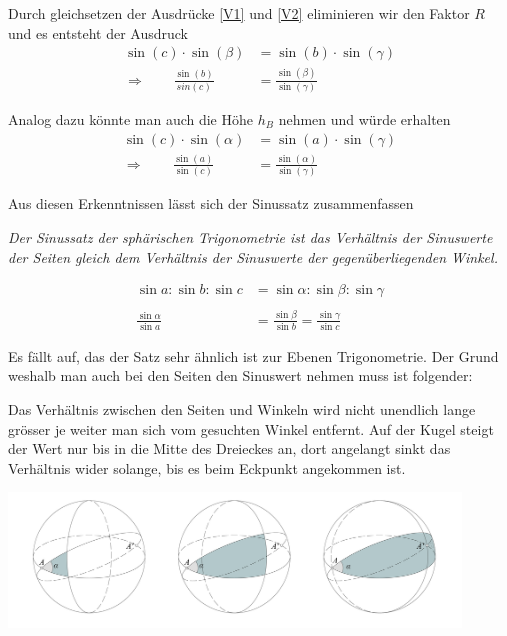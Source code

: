 \begin{refsection}
Durch gleichsetzen der Ausdrücke \eqref{V1} und \eqref{V2} eliminieren wir den Faktor $R$ und es entsteht der Ausdruck
\begin{align*}
\sin(c) \cdot \sin(\beta) &= \sin(b) \cdot \sin(\gamma) \\
\Rightarrow \quad \quad
\frac{\sin (b)}{sin (c)} &= \frac{\sin (\beta)}{\sin (\gamma)}
\end{align*}

Analog dazu könnte man auch die Höhe $h_{B}$ nehmen und würde erhalten
\begin{align*}
\sin(c) \cdot \sin(\alpha) &= \sin(a) \cdot \sin(\gamma) \\
\Rightarrow \quad \quad
\frac{\sin (a)}{\sin (c)} &= \frac{\sin (\alpha)}{\sin (\gamma)}
\end{align*}

Aus diesen Erkenntnissen lässt sich der Sinussatz zusammenfassen
\begin{satz}\textit{Der Sinussatz der sphärischen Trigonometrie ist das Verhältnis der Sinuswerte der Seiten gleich dem Verhältnis der Sinuswerte der gegenüberliegenden Winkel.}
\label{skript:kugel:satz:Sinussatz}
\end{satz}

\begin{align*}
\sin a : \sin b : \sin c &= \sin \alpha : \sin \beta : \sin \gamma \\
 \\
\frac{\sin \alpha}{\sin a} &= \frac{\sin \beta}{\sin b} = \frac{\sin \gamma}{\sin c}
\end{align*} 

Es fällt auf, das der Satz sehr ähnlich ist zur Ebenen Trigonometrie. Der Grund weshalb man auch bei den Seiten den Sinuswert nehmen muss ist folgender:

Das Verhältnis zwischen den Seiten und Winkeln wird nicht unendlich lange grösser je weiter man sich vom gesuchten Winkel entfernt. Auf der Kugel steigt der Wert nur bis in die Mitte des Dreieckes an, dort angelangt sinkt das Verhältnis wider solange, bis es beim Eckpunkt angekommen ist.

\begin{center}
        \includegraphics[width=0.9\textwidth]{kugel/SinussatzB.jpg}
\end{center}


\end{refsection}
